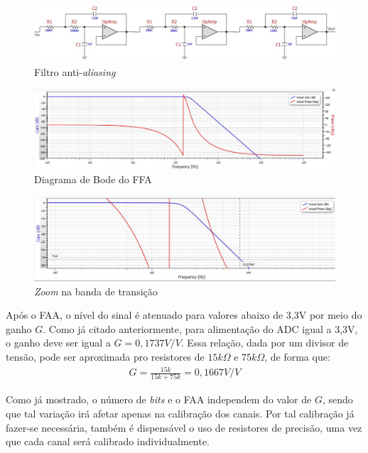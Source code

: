 \documentclass[11pt]{abntex2}
\begin{document}
			\begin{figure}[!ht]
				\centering
				\includegraphics[width=\linewidth]{../Fotos/filterPro.jpg}
				\caption{Filtro anti-\textit{aliasing}}
			\end{figure}

			\begin{figure}[!ht]
				\centering
				\includegraphics[width=\linewidth]{../Fotos/filterProGF.jpg}
				\caption{Diagrama de Bode do FFA}
			\end{figure}

			\begin{figure}[!ht]
				\centering
				\includegraphics[width=\linewidth]{../Fotos/filterProZoom.jpg}
				\caption{\textit{Zoom} na banda de transição}
			\end{figure}

			Após o FAA, o nível do sinal é atenuado para valores abaixo de
			3,3V por meio do ganho $G$. Como já citado anteriormente, para
			alimentação do ADC igual  a 3,3V, o ganho deve ser igual a $G =
			0,1737V/V$. Essa relação, dada por um divisor de tensão, pode
			ser aproximada pro resistores de $15k\Omega$ e $75k\Omega$, de
			forma que:
			\begin{gather*}
				G = \frac{15k}{15k+75k} = 0,1667V/V
			\end{gather*}

			Como já mostrado, o número de \textit{bits} e o FAA independem do valor
			de $G$, sendo que tal variação irá afetar apenas na calibração dos
			canais. Por tal calibração já fazer-se necessária, também é
			dispensável o uso de resistores de precisão, uma vez que cada
			canal será calibrado individualmente.
\end{document}
